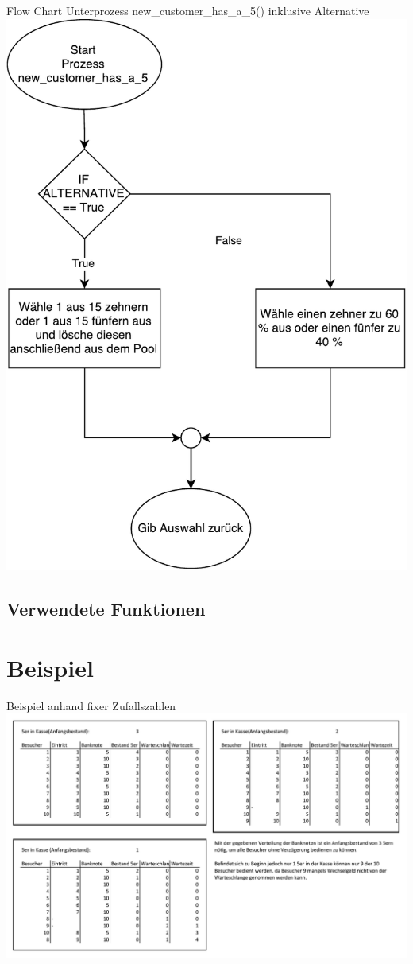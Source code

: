 \begin{frame}{Flow Chart Unterprozess new\_customer\_has\_a\_5() inklusive Alternative}
	\centering
  	\includegraphics[scale=0.3]{BSP18_Flow_Chart_3.pdf}
\end{frame}


\subsection{Verwendete Funktionen}
%
%



\section{Beispiel}
\begin{frame}[fragile]{Beispiel anhand fixer Zufallszahlen}
	\centering
  	\includegraphics[scale=.5]{BSP18_Zufallszahlen.png}
\end{frame}



